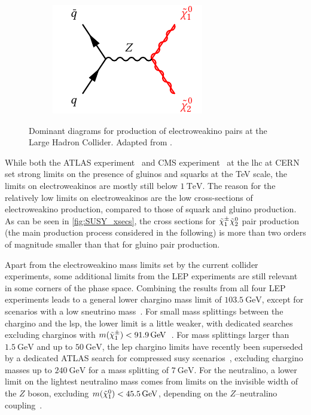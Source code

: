 \begin{figure}
\begin{subfigure}[b]{0.33\linewidth}
		\centering\includegraphics[width=.9\textwidth]{electroweakino_production_3}
		\caption{\label{fig:electroweakino_production_3}}
	\end{subfigure}	
	\caption{Dominant diagrams for production of electroweakino pairs at the Large Hadron Collider. Adapted from \cite{Martin:1997ns}.}\label{fig:electroweakino_production}
\end{figure}

While both the ATLAS experiment~\cite{ATLASsummary} and CMS experiment~\cite{CMSsummary} at the \gls{lhc} at CERN set strong limits on the presence of gluinos and squarks at the TeV scale, the limits on electroweakinos are mostly still below $\SI{1}{\TeV}$. 
The reason for the relatively low limits on electroweakinos are the low cross-sections of electroweakino production, compared to those of squark and gluino production.
As can be seen in \cref{fig:SUSY_xsecs}, the cross sections for $\tilde{\chi}_1^\pm\tilde{\chi}_2^0$ pair production (the main production process considered in the following) is more than two orders of magnitude smaller than that for gluino pair production.  

Apart from the electroweakino mass limits set by the current collider experiments, some additional limits from the LEP experiments are still relevant in some corners of the phase space. Combining the results from all four LEP experiments leads to a general lower chargino mass limit of $\SI{103.5}{\GeV}$, except for scenarios with a low sneutrino mass~\cite{lep_susy_results}. For small mass splittings between the chargino and the \gls{lsp}, the lower limit is a little weaker, with dedicated searches excluding charginos with $m(\charg) < \SI{91.9}{\GeV}$~\cite{lep_susy_results}. For mass splittings larger than $\SI{1.5}{\GeV}$ and up to $\SI{50}{\GeV}$, the \gls{lep} chargino limits have recently been superseded by a dedicated ATLAS search for compressed \gls{susy} scenarios~\cite{SUSY-2018-16}, excluding chargino masses up to $\SI{240}{\GeV}$ for a mass splitting of $\SI{7}{\GeV}$. For the neutralino, a lower limit on the lightest neutralino mass comes from limits on the invisible width of the $Z$ boson, excluding $m(\lsp) < \SI{45.5}{\GeV}$, depending on the $Z$--neutralino coupling~\cite{pdg2020}. 

